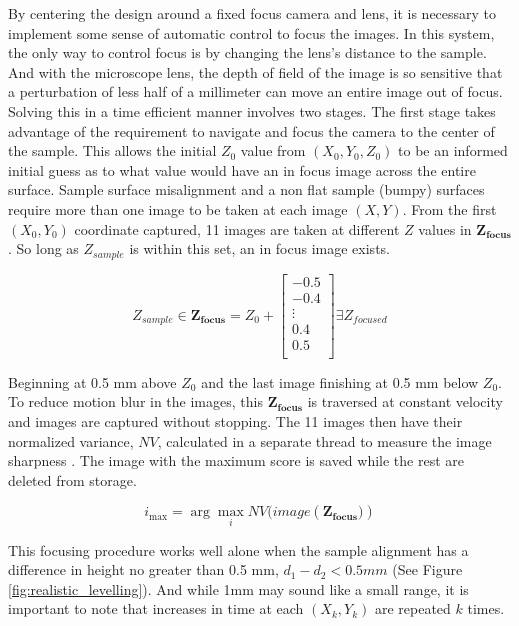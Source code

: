 \documentclass[a4paper,12pt]{article}
\begin{document}
By centering the design around a fixed focus camera and lens, it is necessary to implement some sense of automatic control to focus the images. 
In this system, the only way to control focus is by changing the lens's distance to the sample. 
And with the microscope lens, the depth of field of the image is so sensitive that a perturbation of less half of a millimeter can move an entire image out of focus.
Solving this in a time efficient manner involves two stages. 
The first stage takes advantage of the requirement to navigate and focus the camera to the center of the sample.
This allows the initial $Z_0$ value from $(X_0, Y_0, Z_0)$ to be an informed initial guess as to what value would have an in focus image across the entire surface. 
Sample surface misalignment and a non flat sample (bumpy) surfaces require more than one image to be taken at each image $(X, Y)$. 
From the first $(X_0, Y_0)$ coordinate captured, 11 images are taken at different $Z$ values in $\boldsymbol{Z_{\text{focus}}}$. 
So long as $Z_{sample}$ is within this set, an in focus image exists.

\[
Z_{sample} \in
\boldsymbol{Z_{\text{focus}}} = 
Z_0 + 
\begin{bmatrix}
-0.5 \\
-0.4 \\
\vdots \\
0.4 \\
0.5 \\
\end{bmatrix}
\exists 
Z_{focused}
\] %

Beginning at 0.5 mm above $Z_0$ and the last image finishing at 0.5 mm below $Z_0$.
To reduce motion blur in the images, this $\boldsymbol{Z_{\text{focus}}}$ is traversed at constant velocity and images are captured without stopping. 
The 11 images then have their normalized variance, $NV$, calculated in a separate thread to measure the image sharpness \citep{sampat_extensive_2014}.
The image with the maximum score is saved while the rest are deleted from storage.

\[
    i_{\max} = \arg\max_{i} NV(image(\boldsymbol{{Z_\text{focus}})})
\]
    
This focusing procedure works well alone when the sample alignment has a difference in height no greater than 0.5 mm, $d_1 - d_2 < 0.5 mm $ (See Figure \ref{fig:realistic_levelling}). 
And while 1mm may sound like a small range, it is important to note that increases in time at each $(X_k, Y_k)$ are repeated $k$ times. 
\end{document}
